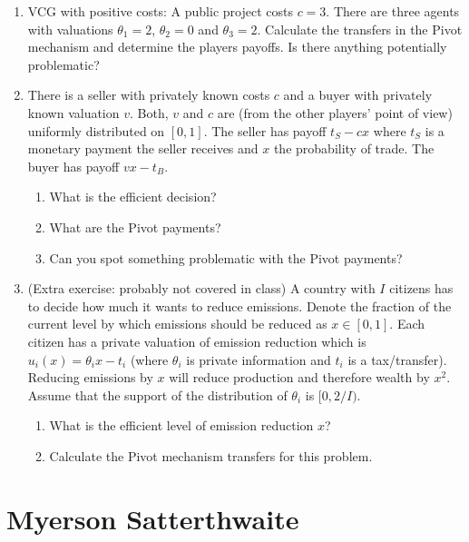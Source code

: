 \documentclass[a4paper,12pt]{article}
\begin{document}
\begin{enumerate}
\item VCG with positive costs: A public project costs $c=3$. There are three agents with valuations $\theta _1=2$, $\theta _2=0$ and $\theta _3=2$. Calculate the transfers in the Pivot mechanism and determine the players payoffs. Is there anything potentially problematic?
\item There is a seller with privately known costs $c$ and a buyer with privately known valuation $v$. Both, $v$ and $c$ are (from the other players' point of view) uniformly distributed on $[0,1]$. The seller has payoff $t_S-c x$ where $t_S$ is a monetary payment the seller receives and $x$ the probability of trade. The buyer has payoff $vx-t_B$.
  \begin{enumerate}
  \item What is the efficient decision?
  \item What are the Pivot payments?
    \item Can you spot something problematic with the Pivot payments?
    \end{enumerate}
\item (Extra exercise: probably not covered in class) A country with $I$ citizens has to decide how much it wants to reduce emissions. Denote the fraction of the current level by which emissions should be reduced as $x\in[0,1]$. Each citizen has a private valuation of emission reduction which is $u_i(x)=\theta _ix-t_i$ (where $\theta _i$ is private information and $t_i$ is a tax/transfer). Reducing emissions by $x$ will reduce production and therefore wealth by $x^2$. Assume that the support of the distribution of $\theta _i$ is $[0,2/I)$.
  \begin{enumerate}
  \item What is the efficient level of emission reduction $x$?
    \item Calculate the Pivot mechanism transfers for this problem.
  \end{enumerate}
\end{enumerate}

\section{Myerson Satterthwaite}
\label{sec:myers-satt}
\end{document}
